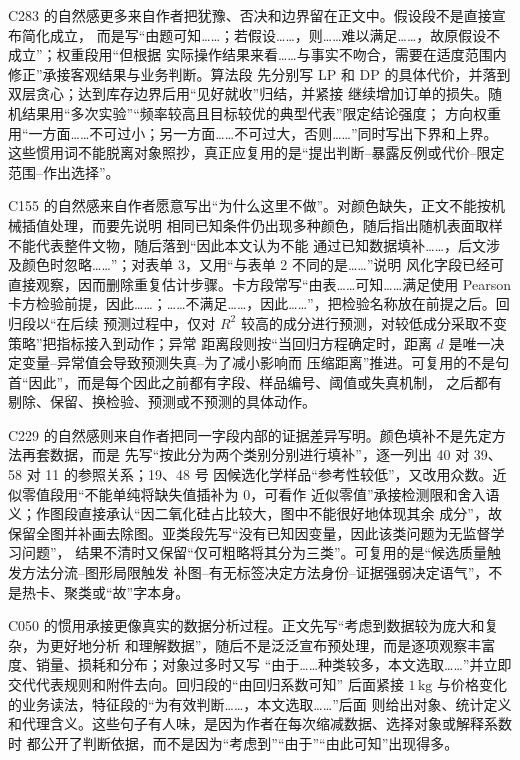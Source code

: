 C283 的自然感更多来自作者把犹豫、否决和边界留在正文中。假设段不是直接宣布简化成立，
而是写“由题可知……；若假设……，则……难以满足……，故原假设不成立”；权重段用“但根据
实际操作结果来看……与事实不吻合，需要在适度范围内修正”承接客观结果与业务判断。算法段
先分别写 LP 和 DP 的具体代价，并落到双层贪心；达到库存边界后用“见好就收”归结，并紧接
继续增加订单的损失。随机结果用“多次实验”“频率较高且目标较优的典型代表”限定结论强度；
方向权重用“一方面……不可过小；另一方面……不可过大，否则……”同时写出下界和上界。
这些惯用词不能脱离对象照抄，真正应复用的是“提出判断--暴露反例或代价--限定范围--作出选择”。

C155 的自然感来自作者愿意写出“为什么这里不做”。对颜色缺失，正文不能按机械插值处理，而要先说明
相同已知条件仍出现多种颜色，随后指出随机表面取样不能代表整件文物，随后落到“因此本文认为不能
通过已知数据填补……，后文涉及颜色时忽略……”；对表单 3，又用“与表单 2 不同的是……”说明
风化字段已经可直接观察，因而删除重复估计步骤。卡方段常写“由表……可知……满足使用 Pearson
卡方检验前提，因此……；……不满足……，因此……”，把检验名称放在前提之后。回归段以“在后续
预测过程中，仅对 $R^2$ 较高的成分进行预测，对较低成分采取不变策略”把指标接入到动作；异常
距离段则按“当回归方程确定时，距离 $d$ 是唯一决定变量--异常值会导致预测失真--为了减小影响而
压缩距离”推进。可复用的不是句首“因此”，而是每个因此之前都有字段、样品编号、阈值或失真机制，
之后都有剔除、保留、换检验、预测或不预测的具体动作。

C229 的自然感则来自作者把同一字段内部的证据差异写明。颜色填补不是先定方法再套数据，而是
先写“按此分为两个类别分别进行填补”，逐一列出 40 对 39、58 对 11 的参照关系；19、48 号
因候选化学样品“参考性较低”，又改用众数。近似零值段用“不能单纯将缺失值插补为 0，可看作
近似零值”承接检测限和舍入语义；作图段直接承认“因二氧化硅占比较大，图中不能很好地体现其余
成分”，故保留全图并补画去除图。亚类段先写“没有已知因变量，因此该类问题为无监督学习问题”，
结果不清时又保留“仅可粗略将其分为三类”。可复用的是“候选质量触发方法分流--图形局限触发
补图--有无标签决定方法身份--证据强弱决定语气”，不是热卡、聚类或“故”字本身。

C050 的惯用承接更像真实的数据分析过程。正文先写“考虑到数据较为庞大和复杂，为更好地分析
和理解数据”，随后不是泛泛宣布预处理，而是逐项观察丰富度、销量、损耗和分布；对象过多时又写
“由于……种类较多，本文选取……”并立即交代代表规则和附件去向。回归段的“由回归系数可知”
后面紧接 $1\,\mathrm{kg}$ 与价格变化的业务读法，特征段的“为有效判断……，本文选取……”后面
则给出对象、统计定义和代理含义。这些句子有人味，是因为作者在每次缩减数据、选择对象或解释系数时
都公开了判断依据，而不是因为“考虑到”“由于”“由此可知”出现得多。

